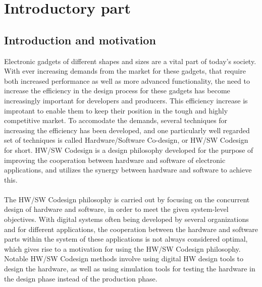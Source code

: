 \chapter{Introductory part}
\section{Introduction and motivation}
Electronic gadgets of different shapes and sizes are a vital part of today's society. With ever increasing demands from the market for these gadgets, that require both increased performance as well as more advanced functionality, the need to increase the efficiency in the design process for these gadgets has become increasingly important for developers and producers. This efficiency increase is improtant to enable them to keep their position in the tough and highly competitive market. To accomodate the demands, several techniques for increasing the efficiency has been developed, and one particularly well regarded set of techniques is called Hardware/Software Co-design, or HW/SW Codesign for short. HW/SW Codesign is a design philosophy developed for the purpose of improving the cooperation between hardware and software of electronic applications, and utilizes the synergy between hardware and software to achieve this. 
\\\\
\noindent
The HW/SW Codesign philosophy is carried out by focusing on the concurrent design of hardware and software, in order to meet the given system-level objectives.\cite{ReadingsHWSW} 
With digital systems often being developed by several organizations and for different applications, the cooperation between the hardware and software parts within the system of these applications is not always considered optimal, which gives rise to a motivation for using the HW/SW Codesign philosophy. Notable HW/SW Codesign methods involve using digital HW design tools to design the hardware, as well as using simulation tools for testing the hardware in the design phase instead of the production phase. 
\\\\


